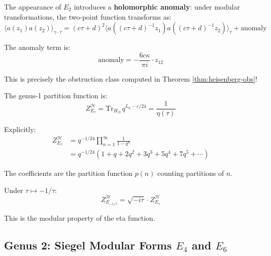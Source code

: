 \begin{remark}\label{rem:E2-holomorphic-anomaly}
The appearance of $E_2$ introduces a \textbf{holomorphic anomaly}: under modular 
transformations, the two-point function transforms as:
\begin{equation}
\langle a(z_1) a(z_2) \rangle_{\gamma \cdot \tau} = (c\tau + d)^2 
\langle a((c\tau+d)^{-1}z_1) a((c\tau+d)^{-1}z_2) \rangle_\tau 
+ \text{anomaly}
\end{equation}

The anomaly term is:
$$\text{anomaly} = -\frac{6c\kappa}{\pi i} \cdot z_{12}$$

This is precisely the obstruction class computed in Theorem \ref{thm:heisenberg-obs}!
\end{remark}

\begin{computation}\label{comp:heisenberg-partition-g1}
The genus-1 partition function is:
\begin{equation}
Z_{E_\tau}^{\mathcal{H}} = \text{Tr}_{H_{\mathcal{H}}} q^{L_0 - c/24} 
= \frac{1}{\eta(\tau)}
\end{equation}

Explicitly:
\begin{align}
Z_{E_\tau}^{\mathcal{H}} &= q^{-1/24} \prod_{n=1}^{\infty} \frac{1}{1 - q^n} \\
&= q^{-1/24}(1 + q + 2q^2 + 3q^3 + 5q^4 + 7q^5 + \cdots)
\end{align}

The coefficients are the partition function $p(n)$ counting partitions of $n$.

Under $\tau \mapsto -1/\tau$:
$$Z_{E_{-1/\tau}}^{\mathcal{H}} = \sqrt{-i\tau} \cdot Z_{E_\tau}^{\mathcal{H}}$$

This is the modular property of the eta function.
\end{computation}

\subsection{Genus 2: Siegel Modular Forms $E_4$ and $E_6$}
\label{subsec:heisenberg-genus-two}

